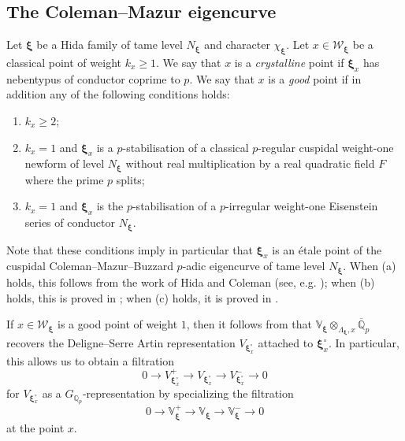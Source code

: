 \documentclass[a4paper,11pt]{amsart}
\theoremstyle{plain}
\theoremstyle{definition}
\theoremstyle{remark}
\newcommand{\bb}{\mathbb}
\newcommand{\cl}{\mathcal}
\newcommand{\hf}{{\mathbf{f}}}
\numberwithin{equation}{section}
\begin{document}
\subsection{The Coleman--Mazur eigencurve}

Let $\bm{\xi}$ be a Hida family of tame level $N_{\bm{\xi}}$ and character $\chi_{\bm{\xi}}$. Let $x\in \cl{W}_{\bm{\xi}}$ be a classical point of weight $k_x\geq 1$. We say that $x$ is a \emph{crystalline} point if $\bm{\xi}_x$ has nebentypus of conductor coprime to $p$. We say that $x$ is a \emph{good} point if in addition any of the following conditions holds: %
\begin{enumerate}
\item[(a)] $k_x \geq 2$;%
\item[(b)] $k_x=1$ and $\bm{\xi}_{x}$ is a $p$-stabilisation of a classical $p$-regular cuspidal weight-one newform of level $N_{\bm{\xi}}$ without real multiplication by a real  quadratic field $F$ where the prime $p$ splits;
\item[(c)] $k_x=1$ and $\bm{\xi}_{x}$ is the $p$-stabilisation of a $p$-irregular weight-one Eisenstein series of conductor $N_{\bm{\xi}}$.
\end{enumerate}

Note that these conditions imply in particular that $\bm{\xi}_{x}$ is an \'etale point of the cuspidal Coleman--Mazur--Buzzard $p$-adic eigencurve of tame level $N_{\bm{\xi}}$. When (a) holds, this follows from the work of Hida and Coleman (see, e.g. \cite{bellaiche11a}); when (b) holds, this is proved in \cite{bellaiche-dimitrov}; when (c) holds, it is proved in \cite{BeDiPo}.

If $x\in \cl{W}_{\bm{\xi}}$ is a good point of weight $1$, then it follows from \cite[Prop.~2.2]{BDV} that $\bb{V}_{\bm{\xi}}\otimes_{\Lambda_{\bm{\xi}},x}\overline{\bb{Q}}_p$ recovers the Deligne--Serre Artin representation $V_{\bm{\xi}_x^\circ}$ attached to $\bm{\xi}_{x}^\circ$. In particular, this allows us to obtain a filtration
\[
0\rightarrow V_{\bm{\xi}_x^\circ}^+ \rightarrow V_{\bm{\xi}_x^\circ} \rightarrow V_{\bm{\xi}_x^\circ}^- \rightarrow 0
\]
for $V_{\bm{\xi}_x^\circ}$ as a $G_{\bb{Q}_p}$-representation by specializing the filtration
\[
0\rightarrow \bb{V}_{\bm{\xi}}^+ \rightarrow \bb{V}_{\bm{\xi}} \rightarrow \bb{V}_{\bm{\xi}}^- \rightarrow 0
\]
at the point $x$.
\end{document}
